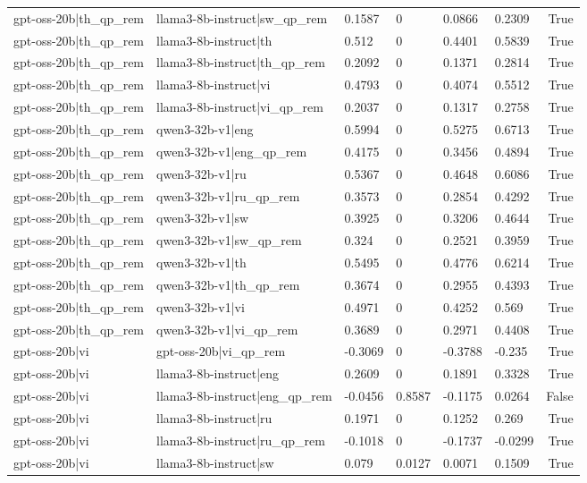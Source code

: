 \begin{table}
\begin{tabular}{llllllr}
gpt-oss-20b|th_qp_rem & llama3-8b-instruct|sw_qp_rem & 0.1587 & 0 & 0.0866 & 0.2309 & True \\
gpt-oss-20b|th_qp_rem & llama3-8b-instruct|th & 0.512 & 0 & 0.4401 & 0.5839 & True \\
gpt-oss-20b|th_qp_rem & llama3-8b-instruct|th_qp_rem & 0.2092 & 0 & 0.1371 & 0.2814 & True \\
gpt-oss-20b|th_qp_rem & llama3-8b-instruct|vi & 0.4793 & 0 & 0.4074 & 0.5512 & True \\
gpt-oss-20b|th_qp_rem & llama3-8b-instruct|vi_qp_rem & 0.2037 & 0 & 0.1317 & 0.2758 & True \\
gpt-oss-20b|th_qp_rem & qwen3-32b-v1|eng & 0.5994 & 0 & 0.5275 & 0.6713 & True \\
gpt-oss-20b|th_qp_rem & qwen3-32b-v1|eng_qp_rem & 0.4175 & 0 & 0.3456 & 0.4894 & True \\
gpt-oss-20b|th_qp_rem & qwen3-32b-v1|ru & 0.5367 & 0 & 0.4648 & 0.6086 & True \\
gpt-oss-20b|th_qp_rem & qwen3-32b-v1|ru_qp_rem & 0.3573 & 0 & 0.2854 & 0.4292 & True \\
gpt-oss-20b|th_qp_rem & qwen3-32b-v1|sw & 0.3925 & 0 & 0.3206 & 0.4644 & True \\
gpt-oss-20b|th_qp_rem & qwen3-32b-v1|sw_qp_rem & 0.324 & 0 & 0.2521 & 0.3959 & True \\
gpt-oss-20b|th_qp_rem & qwen3-32b-v1|th & 0.5495 & 0 & 0.4776 & 0.6214 & True \\
gpt-oss-20b|th_qp_rem & qwen3-32b-v1|th_qp_rem & 0.3674 & 0 & 0.2955 & 0.4393 & True \\
gpt-oss-20b|th_qp_rem & qwen3-32b-v1|vi & 0.4971 & 0 & 0.4252 & 0.569 & True \\
gpt-oss-20b|th_qp_rem & qwen3-32b-v1|vi_qp_rem & 0.3689 & 0 & 0.2971 & 0.4408 & True \\
gpt-oss-20b|vi & gpt-oss-20b|vi_qp_rem & -0.3069 & 0 & -0.3788 & -0.235 & True \\
gpt-oss-20b|vi & llama3-8b-instruct|eng & 0.2609 & 0 & 0.1891 & 0.3328 & True \\
gpt-oss-20b|vi & llama3-8b-instruct|eng_qp_rem & -0.0456 & 0.8587 & -0.1175 & 0.0264 & False \\
gpt-oss-20b|vi & llama3-8b-instruct|ru & 0.1971 & 0 & 0.1252 & 0.269 & True \\
gpt-oss-20b|vi & llama3-8b-instruct|ru_qp_rem & -0.1018 & 0 & -0.1737 & -0.0299 & True \\
gpt-oss-20b|vi & llama3-8b-instruct|sw & 0.079 & 0.0127 & 0.0071 & 0.1509 & True \\

\end{tabular}
\end{table}
